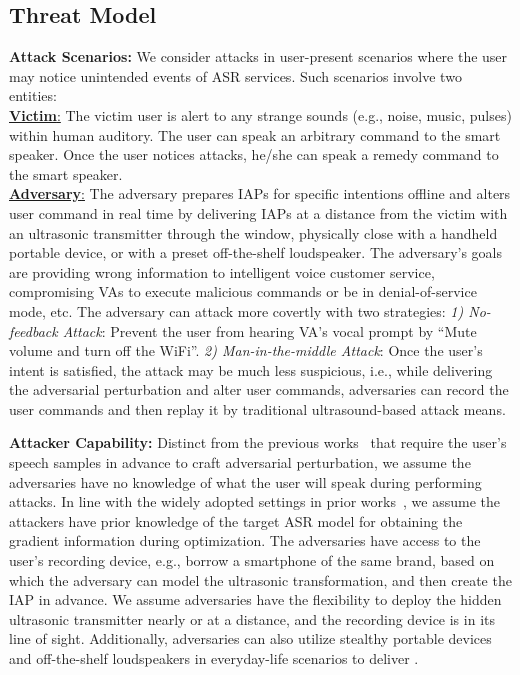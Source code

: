 \subsection{Threat Model}\label{sec:threat_model}
\textbf{Attack Scenarios:}\label{attack_scenario}
We consider attacks in user-present scenarios where the user may notice unintended events of ASR services. Such scenarios involve two entities:\\
\underline{\textbf{Victim}:} The victim user is alert to any strange sounds (e.g., noise, music, pulses) within human auditory. The user can speak an arbitrary command to the smart speaker. Once the user notices attacks, he/she can speak a remedy command to the smart speaker.\\
\underline{\textbf{Adversary}:} The adversary prepares IAPs for specific intentions offline and alters user command in real time by delivering IAPs at a distance from the victim with an ultrasonic transmitter through the window, physically close with a handheld portable device, or with a preset off-the-shelf loudspeaker. The adversary's goals are providing wrong information to intelligent voice customer service, compromising VAs to execute malicious commands or be in denial-of-service mode, etc. The adversary can attack more covertly with two strategies: \textit{1) No-feedback Attack}: Prevent the user from hearing VA's vocal prompt by ``Mute volume and turn off the WiFi''. \textit{2) Man-in-the-middle Attack}: Once the user's intent is satisfied, the attack may be much less suspicious, i.e., while delivering the adversarial perturbation and alter user commands, adversaries can record the user commands and then replay it by traditional ultrasound-based attack means. 

\textbf{Attacker Capability:}
Distinct from the previous works~\cite{carlini2018audio,chen2020metamorph,yuan2018commandersong,qin2019imperceptible,chen2021fakebob,schonherr2018adversarial,li2023tuner} that require the user's speech samples in advance to craft adversarial perturbation, we assume the adversaries have no knowledge of what the user will speak during performing attacks.
In line with the widely adopted settings in prior works~\cite{yuan2018commandersong,carlini2018audio,chen2020metamorph,qin2019imperceptible,guo2022specpatch}, we assume the attackers have prior knowledge of the target ASR model for obtaining the gradient information during optimization.
The adversaries have access to the user's recording device, e.g., borrow a smartphone of the same brand, based on which the adversary can model the ultrasonic transformation, and then create the IAP in advance.
We assume adversaries have the flexibility to deploy the hidden ultrasonic transmitter nearly or at a distance, and the recording device is in its line of sight. Additionally, adversaries can also utilize stealthy portable devices and off-the-shelf loudspeakers in everyday-life scenarios to deliver \alias.
